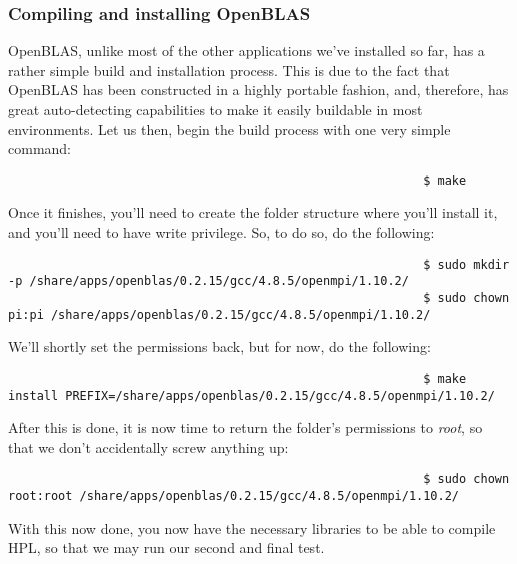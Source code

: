 \documentclass[]{article}
\begin{document}
                                                          \subsubsection{Compiling and installing OpenBLAS}
                                                          OpenBLAS, unlike most of the other applications we've installed so far, has a rather simple build and
                                                          installation process. This is due to the fact that OpenBLAS has been constructed in a highly portable
                                                          fashion, and, therefore, has great auto-detecting capabilities to make it easily buildable in most 
                                                          environments. Let us then, begin the build process with one very simple command:
                                                          \begin{lstlisting}
                                                          $ make
                                                          \end{lstlisting}
                                                          Once it finishes, you'll need to create the folder structure where you'll install it, and you'll need to have write privilege. So, to 
                                                          do so, do the following:
                                                          \begin{lstlisting}
                                                          $ sudo mkdir -p /share/apps/openblas/0.2.15/gcc/4.8.5/openmpi/1.10.2/
                                                          $ sudo chown pi:pi /share/apps/openblas/0.2.15/gcc/4.8.5/openmpi/1.10.2/
                                                          \end{lstlisting}
                                                          We'll shortly set the permissions back, but for now, do the following:
                                                          \begin{lstlisting}
                                                          $ make install PREFIX=/share/apps/openblas/0.2.15/gcc/4.8.5/openmpi/1.10.2/
                                                          \end{lstlisting}
                                                          After this is done, it is now time to return the folder's permissions to \textit{root}, so that we don't accidentally screw anything 
                                                          up:
                                                          \begin{lstlisting}
                                                          $ sudo chown root:root /share/apps/openblas/0.2.15/gcc/4.8.5/openmpi/1.10.2/
                                                          \end{lstlisting}
                                                          With this now done, you now have the necessary libraries to be able to compile HPL, so that we may run our second and final test.
\end{document}
